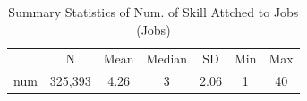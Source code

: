 \begin{table}[htbp]\centering
\def\sym#1{\ifmmode^{#1}\else\(^{#1}\)\fi}
\caption{Summary Statistics of Num. of Skill Attched to Jobs  (Jobs)}
\begin{tabular}{l*{1}{cccccc}}
\toprule
                    &           N&        Mean&      Median&          SD&         Min&         Max\\
\label{tab:jobskillnum}
num                 &     325,393&        4.26&           3&        2.06&           1&          40\\
\bottomrule
\end{tabular}
\end{table}
